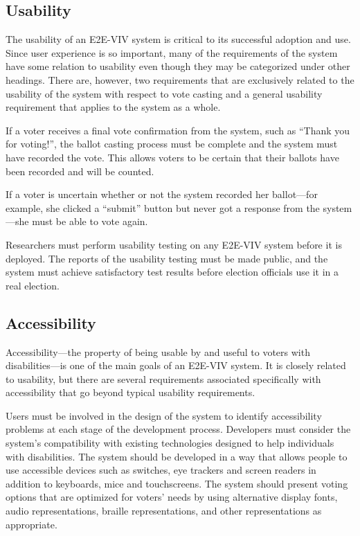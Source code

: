          {\subsection{Usability}}

The usability of an E2E-VIV system is critical to its successful
adoption and use. Since user experience is so important, many of the
requirements of the system have some relation to usability even though
they may be categorized under other headings. There are, however, two
requirements that are exclusively related to the usability of the
system with respect to vote casting and a general usability
requirement that applies to the system as a whole.

If a voter receives a final vote confirmation from the system, such as
``Thank you for voting!'', the ballot casting process must be complete
and the system must have recorded the vote. This allows voters to be
certain that their ballots have been recorded and will be counted.

If a voter is uncertain whether or not the system recorded her
ballot---for example, she clicked a ``submit'' button but never got a
response from the system---she must be able to vote again.

Researchers must perform usability testing on any E2E-VIV system
before it is deployed. The reports of the usability testing must be
made public, and the system must achieve satisfactory test results
before election officials use it in a real election.

\subsection{Accessibility}

Accessibility---the property of being usable by and useful to voters
with disabilities---is one of the main goals of an E2E-VIV system. It
is closely related to usability, but there are several requirements
associated specifically with accessibility that go beyond typical
usability requirements.

Users must be involved in the design of the system to identify
accessibility problems at each stage of the development
process. Developers must consider the system's compatibility with
existing technologies designed to help individuals with disabilities.
The system should be developed in a way that allows people to use
accessible devices such as switches, eye trackers and screen readers
in addition to keyboards, mice and touchscreens. The system should
present voting options that are optimized for voters' needs by using
alternative display fonts, audio representations, braille
representations, and other representations as appropriate.

